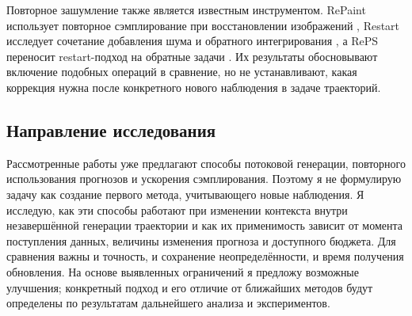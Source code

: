 \documentclass{article}
\begin{document}
Повторное зашумление также является известным инструментом. RePaint использует повторное сэмплирование при восстановлении изображений \citep{p27}, Restart исследует сочетание добавления шума и обратного интегрирования \citep{p25}, а RePS переносит restart-подход на обратные задачи \citep{p26}. Их результаты обосновывают включение подобных операций в сравнение, но не устанавливают, какая коррекция нужна после конкретного нового наблюдения в задаче траекторий.

\subsection{Направление исследования}

Рассмотренные работы уже предлагают способы потоковой генерации, повторного использования прогнозов и ускорения сэмплирования. Поэтому я не формулирую задачу как создание первого метода, учитывающего новые наблюдения. Я исследую, как эти способы работают при изменении контекста внутри незавершённой генерации траектории и как их применимость зависит от момента поступления данных, величины изменения прогноза и доступного бюджета. Для сравнения важны и точность, и сохранение неопределённости, и время получения обновления. На основе выявленных ограничений я предложу возможные улучшения; конкретный подход и его отличие от ближайших методов будут определены по результатам дальнейшего анализа и экспериментов.
\end{document}
